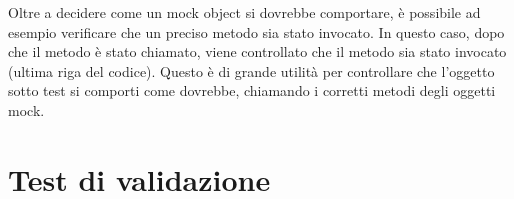     Oltre a decidere come un mock object si dovrebbe comportare, è possibile ad esempio verificare che un preciso metodo sia stato invocato.
    In questo caso, dopo che il metodo  è stato chiamato, viene controllato che il metodo  sia stato invocato (ultima riga del codice).
    Questo è di grande utilità per controllare che l'oggetto sotto test si comporti come dovrebbe, chiamando i corretti metodi degli oggetti mock.


\section{Test di validazione}




